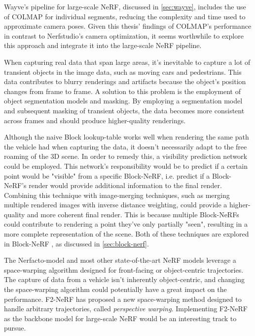 Wayve's pipeline for large-scale NeRF, discussed in \autoref{sec:wayve}, includes the use of COLMAP for individual segments, reducing the complexity and time used to approximate camera poses. Given this thesis' findings of COLMAP's performance in contrast to Nerfstudio's camera optimization, it seems worthwhile to explore this approach and integrate it into the large-scale NeRF pipeline.

When capturing real data that span large areas, it's inevitable to capture a lot of transient objects in the image data, such as moving cars and pedestrians. This data contributes to blurry renderings and artifacts because the object's position changes from frame to frame. A solution to this problem is the employment of object segmentation models and masking. By employing a segmentation model and subsequent masking of transient objects, the data becomes more consistent across frames and should produce higher-quality renderings.

Although the naive Block lookup-table works well when rendering the same path the vehicle had when capturing the data, it doesn't necessarily adapt to the free roaming of the 3D scene. In order to remedy this, a visibility prediction network could be employed. This network's responsibility would be to predict if a certain point would be "visible" from a specific Block-NeRF, i.e. predict if a Block-NeRF's render would provide additional information to the final render. Combining this technique with image-merging techniques, such as merging multiple rendered images with inverse distance weighting, could provide a higher-quality and more coherent final render. This is because multiple Block-NeRFs could contribute to rendering a point they've only partially "seen", resulting in a more complete representation of the scene. Both of these techniques are explored in Block-NeRF \cite{tancik_block-nerf_2022}, as discussed in \autoref{sec:block-nerf}.

The Nerfacto-model and most other state-of-the-art NeRF models leverage a space-warping algorithm designed for front-facing or object-centric trajectories. The capture of data from a vehicle isn't inherently object-centric, and changing the space-warping algorithm could potentially have a great impact on the performance. F2-NeRF\cite{wang_f2-nerf_2023} has proposed a new space-warping method designed to handle arbitrary trajectories, called \textit{perspective warping}. Implementing F2-NeRF as the backbone model for large-scale NeRF would be an interesting track to pursue.






